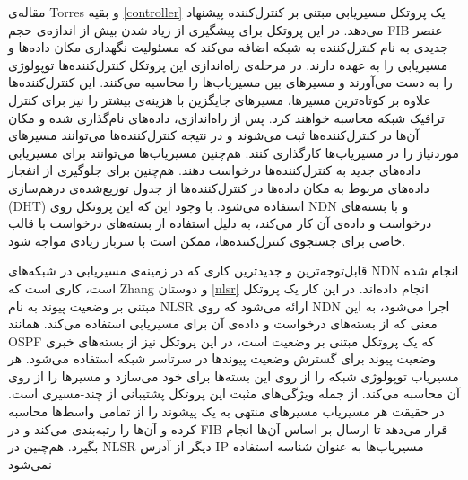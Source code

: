 مقاله‌ی Torres و بقیه \ref{controller} یک پروتکل مسیریابی مبتنی بر کنترل‌کننده پیشنهاد می‌دهد. در این پروتکل برای پیشگیری از زیاد شدن بیش از اندازه‌ی حجم FIB عنصر جدیدی به نام کنترل‌کننده به شبکه اضافه می‌کند که مسئولیت نگهداری مکان داده‌ها و مسیریابی را به عهده دارند. در مرحله‌ی راه‌اندازی این پروتکل کنترل‌کننده‌ها توپولوژی را به دست می‌آورند و مسیرهای بین مسیریاب‌ها را محاسبه می‌کنند. این کنترل‌کننده‌ها علاوه بر کوتاه‌ترین مسیرها، مسیر‌های جایگزین با هزینه‌ی بیشتر را نیز برای کنترل ترافیک شبکه محاسبه خواهند کرد. پس از راه‌اندازی، داده‌های نام‌گذاری شده و مکان آن‌ها در کنترل‌کننده‌ها ثبت می‌شوند و در نتیجه کنترل‌کننده‌ها می‌توانند مسیرهای موردنیاز را در مسیریاب‌ها کارگذاری کنند. هم‌چنین مسیریاب‌ها می‌توانند برای مسیریابی داده‌های جدید به کنترل‌کننده‌ها درخواست دهند. هم‌چنین برای جلوگیری از انفجار داده‌های مربوط به مکان داده‌ها در کنترل‌کننده‌ها از جدول توزیع‌شده‌ی درهم‌سازی  (DHT) استفاده می‌شود. با وجود این که این پروتکل روی NDN و با بسته‌های درخواست و داده‌ی آن کار می‌کند، به دلیل استفاده از بسته‌های درخواست با قالب خاصی برای جستجوی کنترل‌کننده‌ها، ممکن است با سربار زیادی مواجه شود. 

قابل‌توجه‌ترین و جدیدترین کاری که در زمینه‌ی مسیریابی در شبکه‌های NDN انجام شده است، کاری است که Zhang و دوستان \ref{nlsr} انجام داده‌اند. در این کار یک پروتکل مبتنی بر وضعیت پیوند به نام NLSR ارائه می‌شود که روی NDN اجرا می‌شود، به این معنی که از بسته‌های درخواست و داده‌ی آن برای مسیریابی استفاده می‌کند. همانند OSPF که یک پروتکل مبتنی بر وضعیت است، در این پروتکل نیز از بسته‌های خبری وضعیت پیوند برای گسترش وضعیت پیوندها در سرتاسر شبکه استفاده می‌‌شود. هر مسیریاب توپولوژی شبکه را از روی این بسته‌ها برای خود می‌سازد و مسیرها را از روی آن محاسبه می‌کند. از جمله ویژگی‌های مثبت این پروتکل پشتیبانی از چند-مسیری است. در حقیقت هر مسیریاب مسیرهای منتهی به یک پیشوند را از تمامی واسط‌ها محاسبه کرده و آن‌ها را رتبه‌بندی می‌کند و در FIB قرار می‌دهد تا ارسال بر اساس آن‌ها انجام بگیرد. هم‌چنین در NLSR دیگر از آدرس IP مسیریاب‌ها به عنوان شناسه استفاده نمی‌شود 

